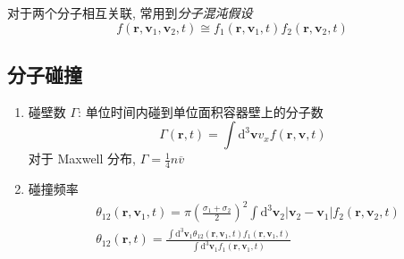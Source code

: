 \documentclass[12pt,a4paper]{article}%
\numberwithin{equation}{section}
\renewcommand*{\vec}[1]{\bm{#1}}%
\newcommand{\dif}{\mathrm{d}}
\begin{document}
对于两个分子相互关联, 常用到\emph{分子混沌假设}
\begin{equation}
    f(\vec r,\vec v_1,\vec v_2,t) \cong f_1(\vec r,\vec v_1,t)f_2(\vec r,\vec v_2, t)
\end{equation}
\subsection{分子碰撞} %
\label{sub:molecule_collision}
\begin{enumerate}
    \item 碰壁数 $\Gamma$: 
    单位时间内碰到单位面积容器壁上的分子数
    \begin{equation}
        \Gamma(\vec r, t) = \int\dif^3\vec v v_xf(\vec r,\vec v, t)
    \end{equation}
    对于 Maxwell 分布, $\Gamma = \frac 14 n\overline v$
    \item 碰撞频率
    \begin{align}
        &\theta_{12}(\vec r,\vec v_1,t) = \pi\left(\frac{\sigma_1+\sigma_2}2\right)^2\int\dif^3\vec v_2|\vec v_2 - \vec v_1|f_2(\vec r,\vec v_2,t) \\
        &\theta_{12}(\vec r,t) = \frac{\int\dif^3\vec v_1\theta_{12}(\vec r,\vec v_1,t)f_1(\vec r,\vec v_1,t)}{\int\dif^3\vec v_1 f_1(\vec r,\vec v_1,t)}
    \end{align}
\end{enumerate}
\end{document}
